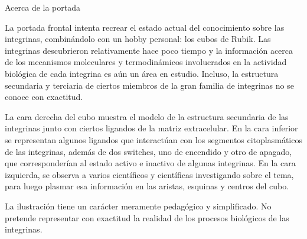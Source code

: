 \thispagestyle{empty}
{\LARGE \textcolor{myblue}{Acerca de la portada}}\\

\begingroup
\setlength{\parindent}{0pt} %

La portada frontal intenta recrear el estado actual del conocimiento sobre las integrinas, combinándolo con un hobby personal: los cubos de Rubik. Las integrinas descubrieron relativamente hace poco tiempo y la información acerca de los mecanismos moleculares y termodinámicos involucrados en la actividad biológica de cada integrina es aún un área en estudio. Incluso, la estructura secundaria y terciaria de ciertos miembros de la gran familia de integrinas no se conoce con exactitud.

La cara derecha del cubo muestra el modelo de la estructura secundaria de las integrinas junto con ciertos ligandos de la matriz extracelular. En la cara inferior se representan algunos ligandos que interactúan con los segmentos citoplasmáticos de las integrinas, además de dos switches, uno de encendido y otro de apagado, que corresponderían al estado activo e inactivo de algunas integrinas. En la cara izquierda, se observa a varios científicos y científicas investigando sobre el tema, para luego plasmar esa información en las aristas, esquinas y centros del cubo. \\\vspace{10cm}


 \tiny {La ilustración tiene un carácter meramente pedagógico y simplificado. No pretende representar con exactitud la realidad de los procesos biológicos de las integrinas.}


\endgroup